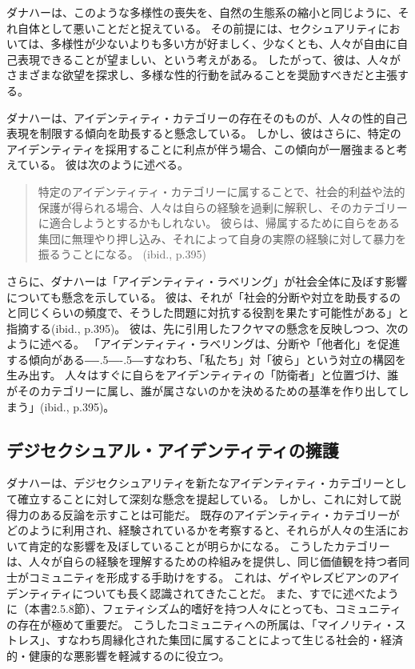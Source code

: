 \documentclass[paper=a4,book,openany]{jlreq}
\def\DDASH{―\kern-.5\zw―\kern-.5\zw―} %
\begin{document}
ダナハーは、このような多様性の喪失を、自然の生態系の縮小と同じように、それ自体として悪いことだと捉えている。
その前提には、セクシュアリティにおいては、多様性が少ないよりも多い方が好ましく、少なくとも、人々が自由に自己表現できることが望ましい、という考えがある。
したがって、彼は、人々がさまざまな欲望を探求し、多様な性的行動を試みることを奨励すべきだと主張する。

ダナハーは、アイデンティティ・カテゴリーの存在そのものが、人々の性的自己表現を制限する傾向を助長すると懸念している。
しかし、彼はさらに、特定のアイデンティティを採用することに利点が伴う場合、この傾向が一層強まると考えている。
彼は次のように述べる。

\begin{quote}
特定のアイデンティティ・カテゴリーに属することで、社会的利益や法的保護が得られる場合、人々は自らの経験を過剰に解釈し、そのカテゴリーに適合しようとするかもしれない。
彼らは、帰属するために自らをある集団に無理やり押し込み、それによって自身の実際の経験に対して暴力を振るうことになる。
(ibid., p.395)

\end{quote}

さらに、ダナハーは「アイデンティティ・ラベリング」が社会全体に及ぼす影響についても懸念を示している。
彼は、それが「社会的分断や対立を助長するのと同じくらいの頻度で、そうした問題に対抗する役割を果たす可能性がある」と指摘する(ibid., p.395)。
彼は、先に引用したフクヤマの懸念を反映しつつ、次のように述べる。
「アイデンティティ・ラベリングは、分断や「他者化」を促進する傾向がある{\DDASH}すなわち、「私たち」対「彼ら」という対立の構図を生み出す。
人々はすぐに自らをアイデンティティの「防衛者」と位置づけ、誰がそのカテゴリーに属し、誰が属さないのかを決めるための基準を作り出してしまう」(ibid., p.395)。

\subsection{デジセクシュアル・アイデンティティの擁護}

ダナハーは、デジセクシュアリティを新たなアイデンティティ・カテゴリーとして確立することに対して深刻な懸念を提起している。
しかし、これに対して説得力のある反論を示すことは可能だ。
既存のアイデンティティ・カテゴリーがどのように利用され、経験されているかを考察すると、それらが人々の生活において肯定的な影響を及ぼしていることが明らかになる。
こうしたカテゴリーは、人々が自らの経験を理解するための枠組みを提供し、同じ価値観を持つ者同士がコミュニティを形成する手助けをする。
これは、ゲイやレズビアンのアイデンティティについても長く認識されてきたことだ。
また、すでに述べたように（本書2.5.8節）、フェティシズム的嗜好を持つ人々にとっても、コミュニティの存在が極めて重要だ。
こうしたコミュニティへの所属は、「マイノリティ・ストレス」、すなわち周縁化された集団に属することによって生じる社会的・経済的・健康的な悪影響を軽減するのに役立つ\citep{salfas19:_what_is_role_commun}。
\end{document}
